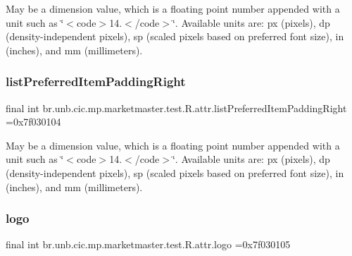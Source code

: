 May be a dimension value, which is a floating point number appended with a unit such as \char`\"{}$<$code$>$14.\+5sp$<$/code$>$\char`\"{}. Available units are\+: px (pixels), dp (density-\/independent pixels), sp (scaled pixels based on preferred font size), in (inches), and mm (millimeters). \mbox{\label{classbr_1_1unb_1_1cic_1_1mp_1_1marketmaster_1_1test_1_1R_1_1attr_a10a838ca6907c9742456c9ca6a3c78af}} 
\subsubsection{\texorpdfstring{list\+Preferred\+Item\+Padding\+Right}{listPreferredItemPaddingRight}}
{\footnotesize\ttfamily final int br.\+unb.\+cic.\+mp.\+marketmaster.\+test.\+R.\+attr.\+list\+Preferred\+Item\+Padding\+Right =0x7f030104\hspace{0.3cm}{\ttfamily [static]}}

May be a dimension value, which is a floating point number appended with a unit such as \char`\"{}$<$code$>$14.\+5sp$<$/code$>$\char`\"{}. Available units are\+: px (pixels), dp (density-\/independent pixels), sp (scaled pixels based on preferred font size), in (inches), and mm (millimeters). \mbox{\label{classbr_1_1unb_1_1cic_1_1mp_1_1marketmaster_1_1test_1_1R_1_1attr_ae403f2002c20c28ab8411ac515632523}} 
\subsubsection{\texorpdfstring{logo}{logo}}
{\footnotesize\ttfamily final int br.\+unb.\+cic.\+mp.\+marketmaster.\+test.\+R.\+attr.\+logo =0x7f030105\hspace{0.3cm}{\ttfamily [static]}}

